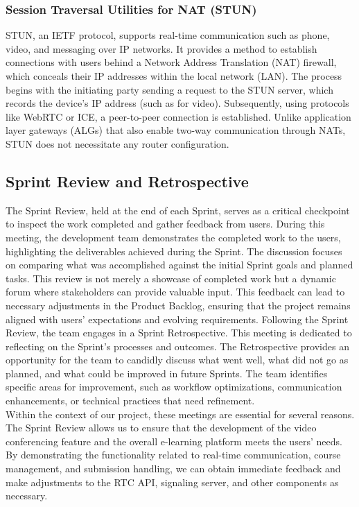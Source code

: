 \documentclass[a4paper,12pt]{article}  %
\begin{document}
\subsubsection{Session Traversal Utilities for NAT (STUN)}
STUN, an IETF protocol, supports real-time communication such as phone, video, and messaging over IP networks. It provides a method to establish connections with users behind a Network Address Translation (NAT) firewall, which conceals their IP addresses within the local network (LAN). The process begins with the initiating party sending a request to the STUN server, which records the device's IP address (such as for video). Subsequently, using protocols like WebRTC or ICE, a peer-to-peer connection is established. Unlike application layer gateways (ALGs) that also enable two-way communication through NATs, STUN does not necessitate any router configuration\cite{emmanuel2022design}.\\

\subsection{Sprint Review and Retrospective}
The Sprint Review, held at the end of each Sprint, serves as a critical checkpoint to inspect the work completed and gather feedback from users. During this meeting, the development team demonstrates the completed work to the users, highlighting the deliverables achieved during the Sprint. The discussion focuses on comparing what was accomplished against the initial Sprint goals and planned tasks. This review is not merely a showcase of completed work but a dynamic forum where stakeholders can provide valuable input. This feedback can lead to necessary adjustments in the Product Backlog, ensuring that the project remains aligned with users’ expectations and evolving requirements. Following the Sprint Review, the team engages in a Sprint Retrospective. This meeting is dedicated to reflecting on the Sprint's processes and outcomes. The Retrospective provides an opportunity for the team to candidly discuss what went well, what did not go as planned, and what could be improved in future Sprints. The team identifies specific areas for improvement, such as workflow optimizations, communication enhancements, or technical practices that need refinement\cite{schwaber2020scrum}.\\

Within the context of our project, these meetings are essential for several reasons. The Sprint Review allows us to ensure that the development of the video conferencing feature and the overall e-learning platform meets the users’ needs. By demonstrating the functionality related to real-time communication, course management, and submission handling, we can obtain immediate feedback and make adjustments to the RTC API, signaling server, and other components as necessary.\\
\end{document}
